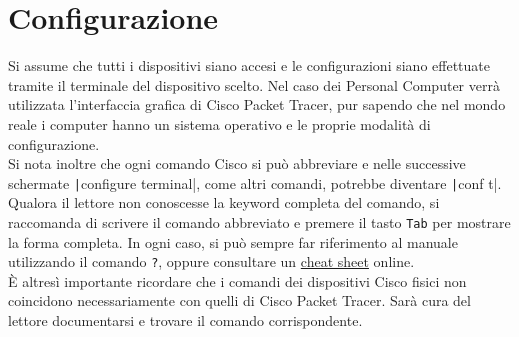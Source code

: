 \documentclass[a4paper,12pt]{report}
\begin{document}
\chapter{Configurazione}
Si assume che tutti i dispositivi siano accesi e le configurazioni siano effettuate tramite il terminale del dispositivo scelto.
%
Nel caso dei Personal Computer verrà utilizzata l'interfaccia grafica di Cisco Packet Tracer, pur sapendo che nel mondo reale i computer hanno un sistema operativo e le proprie modalità di configurazione.
%
\\Si nota inoltre che ogni comando Cisco si può abbreviare e nelle successive schermate \texttt|configure terminal|, come altri comandi, potrebbe diventare \texttt|conf t|.
%
Qualora il lettore non conoscesse la keyword completa del comando, si raccomanda di scrivere il comando abbreviato e premere il tasto \texttt{Tab} per mostrare la forma completa.
%
In ogni caso, si può sempre far riferimento al manuale utilizzando il comando \texttt{?}, oppure consultare un \href{https://www.websentra.com/cisco-commands-cheat-sheet/}{cheat sheet} online.
%
\\È altresì importante ricordare che i comandi dei dispositivi Cisco fisici non coincidono necessariamente con quelli di Cisco Packet Tracer.
%
Sarà cura del lettore documentarsi e trovare il comando corrispondente.
\end{document}
